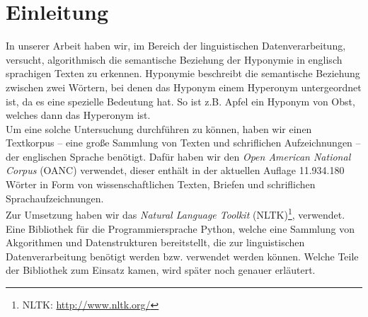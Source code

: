 \section{Einleitung}

In unserer Arbeit haben wir, im Bereich der linguistischen
Datenverarbeitung, versucht, algorithmisch die semantische
Beziehung der Hyponymie in englisch sprachigen Texten zu erkennen.
Hyponymie beschreibt die semantische Beziehung zwischen zwei Wörtern,
bei denen das Hyponym einem Hyperonym untergeordnet ist, da es eine
spezielle Bedeutung hat. So ist z.B. Apfel ein Hyponym von Obst,
welches dann das Hyperonym ist. \cite{bib:Glueck2005}%
\\%
Um eine solche Untersuchung durchführen zu können, haben wir einen
Textkorpus -- eine große Sammlung von Texten und schriflichen
Aufzeichnungen -- der englischen Sprache benötigt. Dafür haben wir den
\textit{Open American National Corpus} (OANC) verwendet, dieser
enthält in der aktuellen Auflage 11.934.180 Wörter in Form von
wissenschaftlichen Texten, Briefen und schriflichen
Sprachaufzeichnungen. \cite{bib:Ide2002}%
\\%
Zur Umsetzung haben wir das \textit{Natural Language Toolkit}
(NLTK)\footnote{NLTK: \url{http://www.nltk.org/}},
verwendet. Eine Bibliothek für die Programmiersprache Python, welche
eine Sammlung von Akgorithmen und Datenstrukturen bereitstellt, die zur
linguistischen Datenverarbeitung benötigt werden bzw. verwendet werden
können. \cite{bib:Bird2006} Welche Teile der Bibliothek zum Einsatz
kamen, wird später noch genauer erläutert.%
